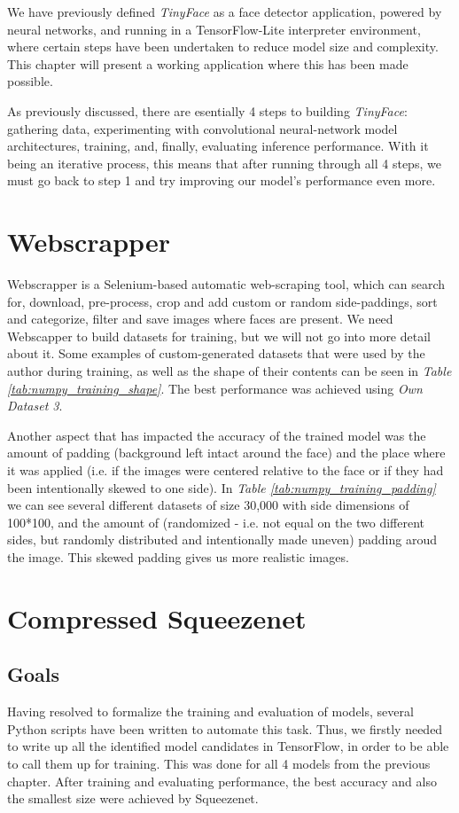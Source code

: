 We have previously defined \textit{TinyFace} as a face detector application, powered by neural networks, and running in a TensorFlow-Lite interpreter environment, where certain steps have been undertaken to reduce model size and complexity. This chapter will present a working application where this has been made possible. \par
As previously discussed, there are esentially 4 steps to building \textit{TinyFace}: gathering data, experimenting with convolutional neural-network model architectures, training, and, finally, evaluating inference performance. With it being an iterative process, this means that after running through all 4 steps, we must go back to step 1 and try improving our model's performance even more. \par

\section{Webscrapper}

Webscrapper is a Selenium-based automatic web-scraping tool, which can search for, download, pre-process, crop and add custom or random side-paddings, sort and categorize, filter and save images where faces are present. We need Webscapper to build datasets for training, but we will not go into more detail about it. Some examples of custom-generated datasets that were used by the author during training, as well as the shape of their contents can be seen in \textit{Table \ref{tab:numpy_training_shape}}. The best performance was achieved using \textit{Own Dataset 3}. \par
Another aspect that has impacted the accuracy of the trained model was the amount of padding (background left intact around the face) and the place where it was applied (i.e. if the images were centered relative to the face or if they had been intentionally skewed to one side). In \textit{Table \ref{tab:numpy_training_padding}} we can see several different datasets of size 30,000 with side dimensions of 100*100, and the amount of (randomized - i.e. not equal on the two different sides, but randomly distributed and intentionally made uneven) padding aroud the image. This skewed padding gives us more realistic images.

\section{Compressed Squeezenet}
\subsection{Goals}
Having resolved to formalize the training and evaluation of models, several Python scripts have been written to automate this task. Thus, we firstly needed to write up all the identified model candidates in TensorFlow, in order to be able to call them up for training. This was done for all 4 models from the previous chapter. After training and evaluating performance, the best accuracy and also the smallest size were achieved by Squeezenet.
